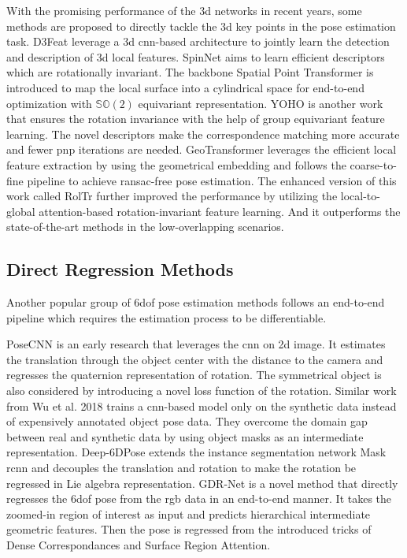 \documentclass[12pt,DIV14,BCOR12mm,a4paper,footinclude=false,headinclude,parskip=half-,twoside,openright,cleardoublepage=empty,toc=index,bibliography=totoc,listof=totoc]{scrreprt}
\numberwithin{equation}{chapter}
\begin{document}
With the promising performance of the \gls{3d} networks \cite{qi2017pointnet,qi2017pointnet++} in recent years, some methods are proposed to directly tackle the \gls{3d} key points in the pose estimation task. D3Feat \cite{bai2020d3feat} leverage a \gls{3d} \gls{cnn}-based architecture to jointly learn the detection and description of \gls{3d} local features. SpinNet \cite{ao2021spinnet} aims to learn efficient descriptors which are rotationally invariant. The backbone Spatial Point Transformer is introduced to map the local surface into a cylindrical space for end-to-end optimization with $\mathbb{SO}(2)$ equivariant representation. YOHO \cite{wang2022hypothesize} is another work that ensures the rotation invariance with the help of group equivariant feature learning. The novel descriptors make the correspondence matching more accurate and fewer \gls{pnp} iterations are needed. GeoTransformer \cite{qin2022geometric} leverages the efficient local feature extraction by using the geometrical embedding and follows the coarse-to-fine pipeline to achieve \gls{ransac}-free pose estimation. The enhanced version of this work called RolTr \cite{yu2023rotationinvariant} further improved the performance by utilizing the local-to-global attention-based rotation-invariant feature learning. And it outperforms the state-of-the-art methods in the low-overlapping scenarios.


\subsection{Direct Regression Methods}
Another popular group of \gls{6dof} pose estimation methods follows an end-to-end pipeline which requires the estimation process to be differentiable.

PoseCNN \cite{xiang2018posecnn} is an early research that leverages the \gls{cnn} on \gls{2d} image. It estimates the translation through the object center with the distance to the camera and regresses the quaternion representation of rotation. The symmetrical object is also considered by introducing a novel loss function of the rotation. Similar work from Wu et al. 2018 \cite{Wu_2018} trains a \gls{cnn}-based model only on the synthetic data instead of expensively annotated object pose data. They overcome the domain gap between real and synthetic data by using object masks as an intermediate representation. Deep-6DPose \cite{do2018deep6dpose} extends the instance segmentation network Mask \gls{rcnn} \cite{he2018mask} and decouples the translation and rotation to make the rotation be regressed in Lie algebra representation. GDR-Net \cite{wang2021gdrnet} is a novel method that directly regresses the \gls{6dof} pose from the \gls{rgb} data in an end-to-end manner. It takes the zoomed-in region of interest as input and predicts hierarchical intermediate geometric features. Then the pose is regressed from the introduced tricks of Dense Correspondances and Surface Region Attention.
\end{document}
